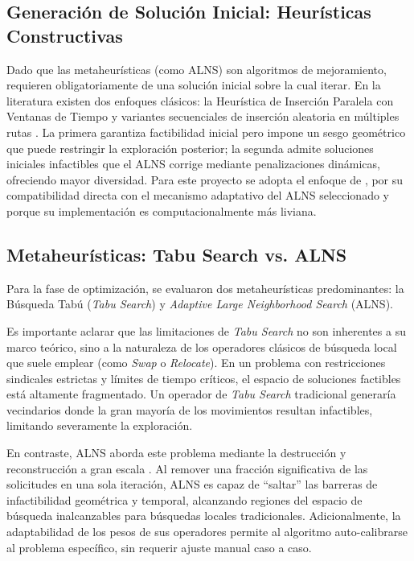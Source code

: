 \subsection{Generación de Solución Inicial: Heurísticas Constructivas}
Dado que las metaheurísticas (como ALNS) son algoritmos de mejoramiento, requieren obligatoriamente de una solución inicial sobre la cual iterar. En la literatura existen dos enfoques clásicos: la Heurística de Inserción Paralela con Ventanas de Tiempo \cite{Jaw1986} y variantes secuenciales de inserción aleatoria en múltiples rutas \cite{Pilati2025}. La primera garantiza factibilidad inicial pero impone un sesgo geométrico que puede restringir la exploración posterior; la segunda admite soluciones iniciales infactibles que el ALNS corrige mediante penalizaciones dinámicas, ofreciendo mayor diversidad. Para este proyecto se adopta el enfoque de \cite{Pilati2025}, por su compatibilidad directa con el mecanismo adaptativo del ALNS seleccionado y porque su implementación es computacionalmente más liviana.

\subsection{Metaheurísticas: Tabu Search vs. ALNS}
Para la fase de optimización, se evaluaron dos metaheurísticas predominantes: la Búsqueda Tabú (\textit{Tabu Search}) y \textit{Adaptive Large Neighborhood Search} (ALNS).

Es importante aclarar que las limitaciones de \textit{Tabu Search} no son inherentes a su marco teórico, sino a la naturaleza de los operadores clásicos de búsqueda local que suele emplear (como \textit{Swap} o \textit{Relocate}). En un problema con restricciones sindicales estrictas y límites de tiempo críticos, el espacio de soluciones factibles está altamente fragmentado. Un operador de \textit{Tabu Search} tradicional generaría vecindarios donde la gran mayoría de los movimientos resultan infactibles, limitando severamente la exploración.

En contraste, ALNS aborda este problema mediante la destrucción y reconstrucción a gran escala \cite{Ropke2006}. Al remover una fracción significativa de las solicitudes en una sola iteración, ALNS es capaz de ``saltar'' las barreras de infactibilidad geométrica y temporal, alcanzando regiones del espacio de búsqueda inalcanzables para búsquedas locales tradicionales. Adicionalmente, la adaptabilidad de los pesos de sus operadores permite al algoritmo auto-calibrarse al problema específico, sin requerir ajuste manual caso a caso.

